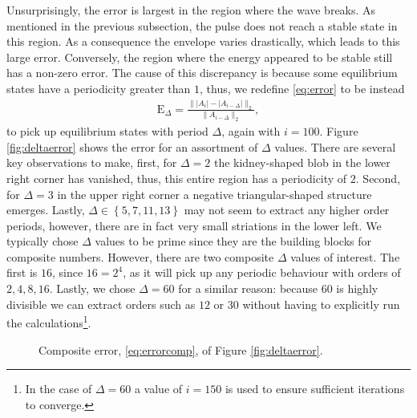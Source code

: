 Unsurprisingly, the error is largest in the region where the wave breaks. As mentioned in the previous subsection, the pulse does not reach a stable state in this region. As a consequence the envelope varies drastically, which leads to this large error. Conversely, the region where the energy appeared to be stable still has a non-zero error. The cause of this discrepancy is because some equilibrium states have a periodicity greater than $1$, thus, we redefine \eqref{eq:error} to be instead
\begin{align}
\textrm{E}_\Delta = \frac{\| |A_i| - |A_{i-\Delta}| \|_2}{\| A_{i-\Delta} \|_2},
\label{eq:deltaerror}
\end{align}
to pick up equilibrium states with period $\Delta$, again with $i = 100$. Figure \ref{fig:deltaerror} shows the error for an assortment of $\Delta$ values. There are several key observations to make, first, for $\Delta = 2$ the kidney-shaped blob in the lower right corner has vanished, thus, this entire region has a periodicity of $2$. Second, for $\Delta = 3$ in the upper right corner a negative triangular-shaped structure emerges. Lastly, $\Delta \in \left\{ 5, 7, 11, 13 \right\}$ may not seem to extract any higher order periods, however, there are in fact very small striations in the lower left. We typically chose $\Delta$ values to be prime since they are the building blocks for composite numbers. However, there are two composite $\Delta$ values of interest. The first is $16$, since $16 = 2^4$, as it will pick up any periodic behaviour with orders of $2, 4, 8, 16$. Lastly, we chose $\Delta = 60$ for a similar reason: because $60$ is highly divisible we can extract orders such as $12$ or $30$ without having to explicitly run the calculations\footnote{In the case of $\Delta = 60$ a value of $i = 150$ is used to ensure sufficient iterations to converge.}. \\

\begin{figure}[tbp]

\caption[Composite error.]{Composite error, \eqref{eq:errorcomp}, of Figure \ref{fig:deltaerror}.}
\label{fig:errorcomp}
\end{figure}

